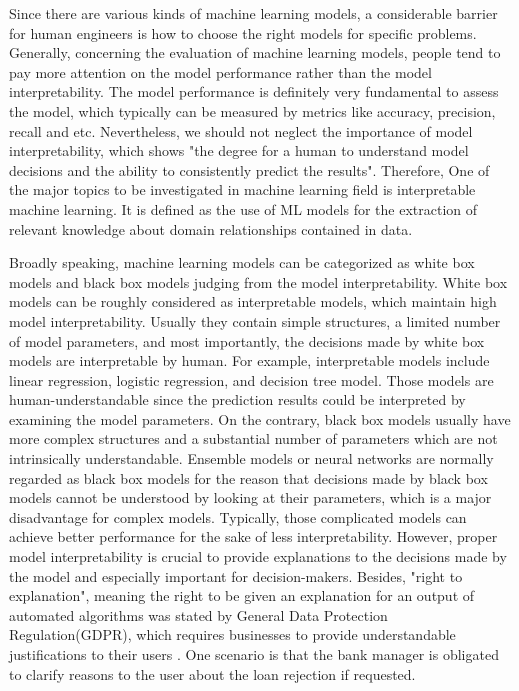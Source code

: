 Since there are various kinds of machine learning models, a considerable barrier for human engineers is how to choose the right models for specific problems. Generally, concerning the evaluation of machine learning models, people tend to pay more attention on the model performance rather than the model interpretability. The model performance is definitely very fundamental to assess the model, which typically can be measured by metrics like accuracy, precision, recall and etc. Nevertheless, we should not neglect the importance of model interpretability, which shows "the degree for a human to understand model decisions and the ability to consistently predict the results"\cite{kim2016examples}. Therefore, One of the major topics to be investigated in machine learning field is interpretable machine learning. It is defined as the use of ML models for the extraction of relevant knowledge about domain relationships contained in data. \cite{murdoch2019interpretable}

Broadly speaking, machine learning models can be categorized as white box models and black box models judging from the model interpretability. White box models can be roughly considered as interpretable models, which maintain high model interpretability. Usually they contain simple structures, a limited number of model parameters, and most importantly, the decisions made by white box models are interpretable by human. For example, interpretable models include linear regression, logistic regression, and decision tree model. Those models are human-understandable since the prediction results could be interpreted by examining the model parameters. On the contrary, black box models usually have more complex structures and a substantial number of parameters which are not intrinsically understandable. Ensemble models or neural networks are normally regarded as black box models for the reason that decisions made by black box models cannot be understood by looking at their parameters, which is a major disadvantage for complex models. Typically, those complicated models can achieve better performance for the sake of less interpretability. However, proper model interpretability is crucial to provide explanations to the decisions made by the model and especially important for decision-makers. Besides, "right to explanation", meaning the right to be given an explanation for an output of automated algorithms was stated by General Data Protection Regulation(GDPR), which requires businesses to provide understandable justifications to their users \cite{voigt2017eu}. One scenario is that the bank manager is obligated to clarify reasons to the user about the loan rejection if requested. 

